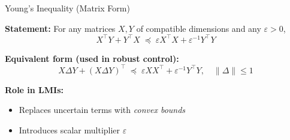 \documentclass{beamer}
\begin{document}
\begin{frame}{Young's Inequality (Matrix Form)}
	
	\begin{flushleft}
		
		\textbf{Statement:} For any matrices $X, Y$ of compatible dimensions and any $\varepsilon > 0$,
		\[
		X^\top Y + Y^\top X \;\preceq\; \varepsilon X^\top X + \varepsilon^{-1} Y^\top Y
		\]
		
		
		\medskip
		
		\textbf{Equivalent form (used in robust control):}
		\[
		X \Delta Y + (X \Delta Y)^\top
		\;\preceq\;
		\varepsilon XX^\top + \varepsilon^{-1} Y^\top Y,
		\quad \|\Delta\| \le 1
		\]
		
		\medskip
		
		\textbf{Role in LMIs:}
		\begin{itemize}
			\item Replaces uncertain terms with \emph{convex bounds}
			\item Introduces scalar multiplier $\varepsilon$
		\end{itemize}
		
	\end{flushleft}
	
\end{frame}
\end{document}
